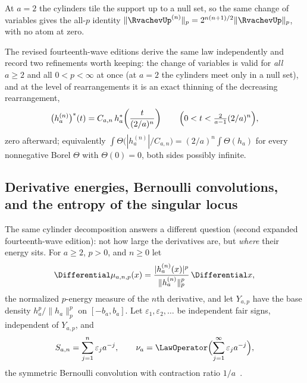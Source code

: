 \documentclass[11pt,oneside]{article}
\numberwithin{equation}{section}
\theoremstyle{definition}
\theoremstyle{remark}
\begin{document}
At $a=2$ the cylinders tile the support up to a null set, so the same change
of variables gives the all-$p$ identity
$\|\RvachevUp^{(n)}\|_p=2^{n(n+1)/2}\|\RvachevUp\|_p$, with no atom at zero.

The revised fourteenth-wave editions derive the same law independently and
record two refinements worth keeping: the change of variables is valid for
\emph{all} $a\ge2$ and all $0<p<\infty$ at once (at $a=2$ the cylinders meet
only in a null set), and at the level of rearrangements it is an exact
thinning of the decreasing rearrangement,
\begin{equation}\label{p6:eq:rearrangement-thinning}
 \bigl(h_a^{(n)}\bigr)^{*}(t)
 =C_{a,n}\,h_a^{*}\!\left(\frac t{(2/a)^n}\right)
 \qquad\Bigl(0<t<\tfrac{2}{a-1}(2/a)^n\Bigr),
\end{equation}
zero afterward; equivalently
$\int\Theta\bigl(|h_a^{(n)}|/C_{a,n}\bigr)
=(2/a)^n\int\Theta(h_a)$ for every nonnegative Borel $\Theta$ with
$\Theta(0)=0$, both sides possibly infinite.

\subsection{Derivative energies, Bernoulli convolutions, and the entropy of
the singular locus}

The same cylinder decomposition answers a different question (second
expanded fourteenth-wave edition): not how large the derivatives are, but
\emph{where} their energy sits.  For $a\ge2$, $p>0$, and $n\ge0$ let
\begin{equation}\label{p6:eq:energy-measure}
 \Differential\mu_{a,n,p}(x)
 =\frac{|h_a^{(n)}(x)|^p}{\|h_a^{(n)}\|_p^p}\,\Differential x,
\end{equation}
the normalized $p$-energy measure of the $n$th derivative, and let
$Y_{a,p}$ have the base density $h_a^p/\|h_a\|_p^p$ on $[-b_a,b_a]$.  Let
$\varepsilon_1,\varepsilon_2,\ldots$ be independent fair signs, independent
of $Y_{a,p}$, and
\[
 S_{a,n}=\sum_{j=1}^{n}\varepsilon_ja^{-j},
 \qquad
 \nu_a=\LawOperator\Bigl(\sum_{j=1}^{\infty}\varepsilon_ja^{-j}\Bigr),
\]
the symmetric Bernoulli convolution with contraction ratio
$1/a$~\cite{p6:peres}.
\end{document}
